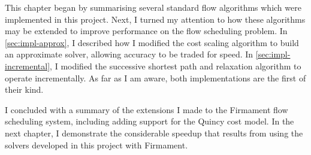 This chapter began by summarising several standard flow algorithms which were implemented in this project. Next, I turned my attention to how these algorithms may be extended to improve performance on the flow scheduling problem. In \cref{sec:impl-approx}, I described how I modified the cost scaling algorithm to build an approximate solver, allowing accuracy to be traded for speed. In \cref{sec:impl-incremental}, I modified the successive shortest path and relaxation algorithm to operate incrementally. As far as I am aware, both implementations are the first of their kind.

I concluded with a summary of the extensions I made to the Firmament flow scheduling system, including adding support for the Quincy cost model. In the next chapter, I demonstrate the considerable speedup that results from using the solvers developed in this project with Firmament.